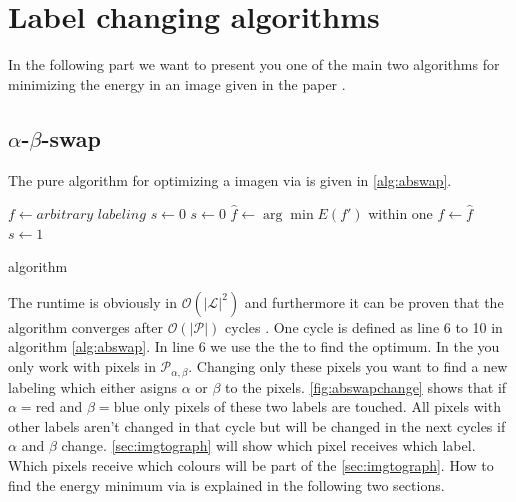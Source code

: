 \documentclass[runningheads,a4paper]{llncs}
\begin{document}
\section{Label changing algorithms}
    In the following part we want to present you one of the main two algorithms for minimizing the energy in an image given in the paper \cite{paper}. 
    \subsection{$\alpha$-$\beta$-swap}
    The pure algorithm for optimizing a imagen via \abswap is given in \ref{alg:abswap}.
        \begin{algorithm}[h]
            \begin{algorithmic}[1]
                \State $f \gets \textit{arbitrary labeling}$
                \State $s \gets 0$
                    \State $s \gets 0$
                        \State $\hat f \gets \arg\min E(f')$ within one \abswap
                            \State $f \gets \hat f$
                            \State $s \gets 1$
                        \EndIf
                    \EndFor
                \EndFor
                \State {}
                \EndProcedure
            \end{algorithmic}
            \caption{\abswap algorithm}
            \label{alg:abswap}
        \end{algorithm}
    The runtime is obviously in $\mathcal{O}(|\mathcal{L}|^2)$ and furthermore it can be proven that the algorithm converges after $\mathcal{O}(|\mathcal{P}|)$ cycles \cite{vekslerefficient}. One cycle is defined as line 6 to 10 in algorithm \ref{alg:abswap}.
    \noindent
    In line 6 we use the the \abswap to find the optimum. In the \abswap you only work with pixels in $\mathcal{P}_{\alpha,\beta}$. Changing only these pixels you want to find a new labeling
    which either asigns $\alpha$ or $\beta$ to the pixels. \autoref{fig:abswapchange} shows that if $\alpha=\text{red}$ and $\beta=\text{blue}$ only pixels of these two labels are touched. All pixels with other labels aren't changed
    in that cycle but will be changed in the next cycles if $\alpha$ and $\beta$ change. 
    \autoref{sec:imgtograph} will show which pixel receives which label.
    Which pixels receive which colours will be part of the \autoref{sec:imgtograph}.
    How to find the energy minimum via \abswap is explained in the following two sections.
\end{document}
